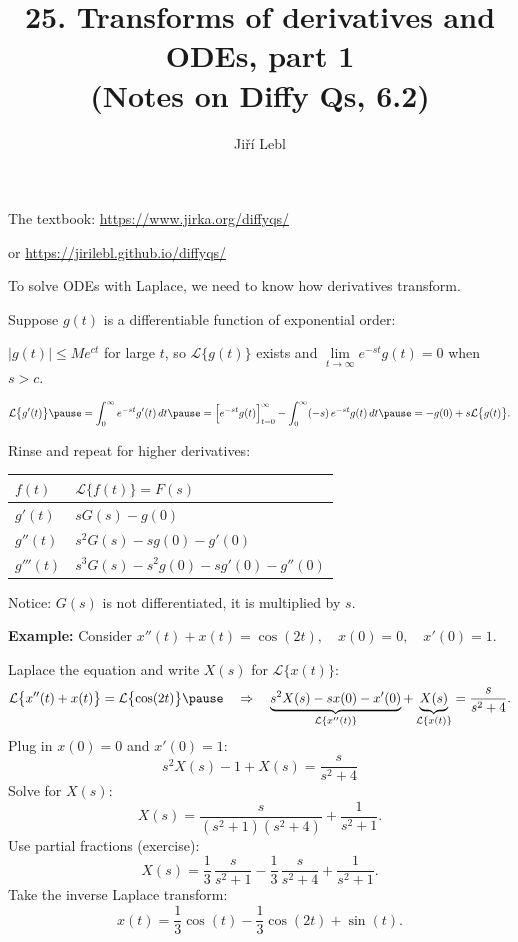 \documentclass[10pt,aspectratio=169]{beamer}
\author{Ji\v{r}\'i Lebl}
\institute[OSU]{%
Oklahoma State University%
}
\title{25. Transforms of derivatives and ODEs, part 1\\(Notes on Diffy Qs, 6.2)}
\date{}
\begin{document}
\begin{frame}
\titlepage


\begin{center}
The textbook: \url{https://www.jirka.org/diffyqs/}

or \url{https://jirilebl.github.io/diffyqs/}
\end{center}
\end{frame}

\begin{frame}
To solve ODEs with Laplace, we need to know how derivatives transform.

\medskip
\pause

Suppose $g(t)$ is a differentiable function of exponential order:

\medskip
\pause

$\lvert g(t) \rvert \leq M e^{ct}$ for large $t$,
\qquad
so $\mathcal{L} \bigl\{ g(t) \bigr\}$ exists
\quad
and
\qquad
 $\lim\limits_{t\to\infty} e^{-st}g(t) = 0$ when $s > c$.

\pause
\[
\mathcal{L} \bigl\{ g'(t) \bigr\}
\pause
=
\int_0^\infty
e^{-st}
g'(t) \,dt
\pause
=
\Bigl[e^{-st} g(t) \Bigr]_{t=0}^\infty
-
\int_0^\infty
(-s)\,
e^{-st}
g(t) \,dt
\pause
=
-g(0) + s \mathcal{L} \bigl\{ g(t) \bigr\} .
\]
\pause

Rinse and repeat for higher derivatives:
\begin{center}
\begin{tabular}{@{}ll@{}}
\toprule
$f(t)$ & $\mathcal{L} \bigl\{ f(t) \bigr\} = F(s)$ \\
\midrule
$g'(t)$ & $sG(s)-g(0)$ \\[4pt]
$g''(t)$ & $s^2G(s)-sg(0)-g'(0)$ \\[4pt]
$g'''(t)$ & $s^3G(s)-s^2g(0)-sg'(0)-g''(0)$ \\[4pt]
\bottomrule
\end{tabular}
\end{center}
\pause
Notice: $G(s)$ is not differentiated, it is multiplied by $s$.

\end{frame}

\begin{frame}
\textbf{Example:}
Consider
\qquad
$x''(t) + x(t) = \cos (2t), \quad x(0) = 0, \quad x'(0) = 1$.

\medskip
\pause

Laplace the equation and write $X(s)$ for $\mathcal{L}\bigl\{x(t)\bigr\}$:
\[
\mathcal{L} \bigl\{ x''(t) + x(t) \bigr\}
= \mathcal{L} \bigl\{ \cos (2t) \bigr\}
\pause
\quad
\Rightarrow
\quad
\underbrace{s^2 X(s) -sx(0)-x'(0)}_{\mathcal{L}\{x''(t)\}}
+ \underbrace{X(s)}_{\mathcal{L}\{x(t)\}}
= \frac{s}{s^2 + 4} .
\]
\pause
Plug in $x(0)=0$ and $x'(0)=1$:
\[
s^2 X(s) -1 + X(s) = \dfrac{s}{s^2 + 4}
\]
\pause
Solve for $X(s)$:
\[
X(s) = \frac{s}{(s^2+1)(s^2 + 4)} + \frac{1}{s^2+1} .
\]
\pause
Use partial fractions (exercise):
\[
X(s) =\frac{1}{3} \, \frac{s}{s^2+1} - 
\frac{1}{3}\, \frac{s}{s^2+4} + \frac{1}{s^2+1} .
\]
\pause
Take the inverse Laplace transform:
\[
x(t) =\frac{1}{3}  \cos (t) -
\frac{1}{3} \cos (2t) + \sin (t) .
\]
\end{frame}
\end{document}
